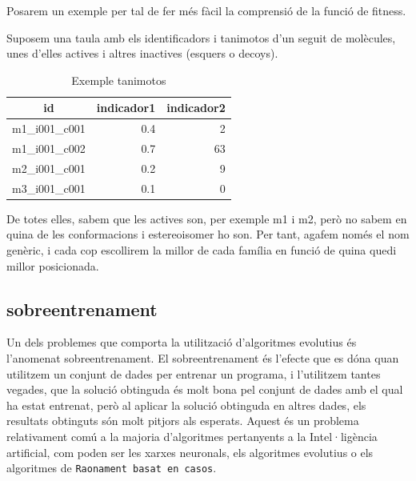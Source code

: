 Posarem un exemple per tal de fer més fàcil la comprensió de la funció de
fitness.

Suposem una taula amb els identificadors i tanimotos d'un seguit de molècules,
unes d'elles actives i altres inactives (esquers o decoys).



\begin{table}
\centering
\begin{tabular}{|l|r|r|}
\hline
\multicolumn{1}{|c|}{\textbf{id }} & \multicolumn{1}{c|}{\textbf{ indicador1 }} & \multicolumn{1}{c|}{\textbf{ indicador2}} \\
\hline
\hline
m1\_i001\_c001 & 0.4 & 2  \\
m1\_i001\_c002 & 0.7 & 63 \\
m2\_i001\_c001 & 0.2 & 9  \\
m3\_i001\_c001 & 0.1 & 0  \\
\hline
\end{tabular}
\caption{Exemple tanimotos}
\end{table}

De totes elles, sabem que les actives son, per exemple m1 i m2, però no sabem
en quina de les conformacions i estereoisomer ho son.  Per tant, agafem només el
nom genèric, i cada cop escollirem la millor de cada família en funció de quina
quedi millor posicionada.



\subsection{sobreentrenament} %
\label{sub:sobreentrenament}

Un dels problemes que comporta la utilització d'algoritmes evolutius és
l'anomenat sobreentrenament.  El sobreentrenament és l'efecte que es dóna quan
utilitzem un conjunt de dades per entrenar un programa, i l'utilitzem tantes
vegades, que la solució obtinguda és molt bona pel conjunt de dades amb el qual
ha estat entrenat, però al aplicar la solució obtinguda en altres dades, els
resultats obtinguts són molt pitjors als esperats.  Aquest és un problema
relativament comú a la majoria d'algoritmes pertanyents a la Intel·ligència
artificial, com poden ser les xarxes neuronals, els algoritmes evolutius o els
algoritmes de \texttt{Raonament basat en casos}.

